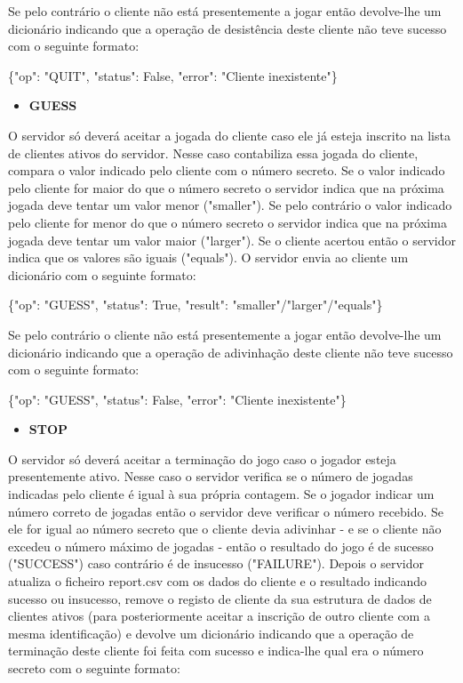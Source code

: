 \documentclass{report}
\begin{document}
Se pelo contrário o cliente não está presentemente a jogar então devolve-lhe um
dicionário indicando que a operação de desistência deste cliente não teve sucesso
com o seguinte formato:
\newline

\{"op": "QUIT", "status": False, "error": "Cliente inexistente"\}


\begin{itemize}
	\item \textbf{GUESS}
\end{itemize}
O servidor só deverá aceitar a jogada do cliente caso ele já esteja inscrito na lista de clientes ativos do servidor. Nesse caso contabiliza essa jogada do cliente, compara
o valor indicado pelo cliente com o número secreto. Se o valor indicado pelo cliente
for maior do que o número secreto o servidor indica que na próxima jogada deve
tentar um valor menor ("smaller"). Se pelo contrário o valor indicado pelo cliente
for menor do que o número secreto o servidor indica que na próxima jogada deve
tentar um valor maior ("larger"). Se o cliente acertou então o servidor indica que
os valores são iguais ("equals"). O servidor envia ao cliente um dicionário com o
seguinte formato:
\newline

\{"op": "GUESS", "status": True, "result": "smaller"/"larger"/"equals"\}
\newline

Se pelo contrário o cliente não está presentemente a jogar então devolve-lhe um
dicionário indicando que a operação de adivinhação deste cliente não teve sucesso
com o seguinte formato:
\newline

\{"op": "GUESS", "status": False, "error": "Cliente inexistente"\}



\begin{itemize}
	\item \textbf{STOP}
\end{itemize}

O servidor só deverá aceitar a terminação do jogo caso o jogador esteja presentemente ativo. Nesse caso o servidor verifica se o número de jogadas indicadas pelo
cliente é igual à sua própria contagem. Se o jogador indicar um número correto
de jogadas então o servidor deve verificar o número recebido. Se ele for igual
ao número secreto que o cliente devia adivinhar - e se o cliente não excedeu o
número máximo de jogadas - então o resultado do jogo é de sucesso ("SUCCESS")
caso contrário é de insucesso ("FAILURE"). Depois o servidor atualiza o ficheiro
report.csv com os dados do cliente e o resultado indicando sucesso ou insucesso,
remove o registo de cliente da sua estrutura de dados de clientes ativos (para
posteriormente aceitar a inscrição de outro cliente com a mesma identificação) e
devolve um dicionário indicando que a operação de terminação deste cliente foi
feita com sucesso e indica-lhe qual era o número secreto com o seguinte formato:
\newline
\end{document}
